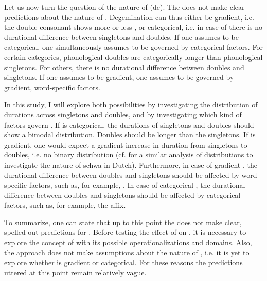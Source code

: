 {{%
Let us now turn the question of the nature of (de). The  does not make clear predictions about the nature of . Degemination can thus either be gradient, i.e. the double consonant shows more or less , or categorical, i.e. in case of  there is no durational difference between singletons and doubles. %
If one assumes  to be categorical, one simultaneously assumes  to be governed by categorical factors. For certain categories, phonological doubles are categorically longer than phonological singletons. For others, there is no durational difference between doubles and singletons. 
If one assumes  to be gradient, one assumes  to be governed by gradient, word-specific factors.

In this study, I will explore both possibilities by investigating the distribution of durations across singletons and doubles, and by investigating which kind of factors govern . %
If  is categorical, the durations of singletons and doubles should show a bimodal distribution. Doubles should be longer than the singletons. If  is gradient, one would expect a gradient increase in duration from singletons to doubles, i.e. no binary distribution (cf.  \cite{Hanique.06.03.2013} for a similar analysis of distributions to investigate the nature of schwa  in Dutch). Furthermore, in case of gradient , the durational difference between doubles and singletons should be affected by word-specific factors, such as, for example, . In case of categorical , the durational difference between doubles and singletons should be affected by categorical factors, such as, for example, the affix.
 


To summarize, one can state that up to this point the  does not make clear, spelled-out predictions for . Before testing the effect of  on , it is necessary to explore the concept of  with its possible operationalizations and domains. Also, the approach does not make assumptions about the nature of , i.e. it is yet to explore whether  is gradient or categorical. 
For these reasons the predictions uttered at this point remain relatively vague. 

}}
